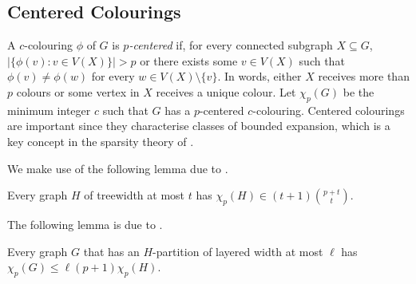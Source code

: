 \documentclass{patmorin}
\renewcommand{\le}{\leqslant}
\begin{document}
\subsection{Centered Colourings}

A $c$-colouring $\phi$ of $G$ is \emph{$p$-centered} if, for every connected subgraph $X\subseteq G$, $|\{\phi(v):v\in V(X)\}| > p$ or there exists some $v\in V(X)$ such that $\phi(v)\neq \phi(w)$ for every $w\in V(X)\setminus\{v\}$.  In words, either $X$ receives more than $p$ colours or some vertex in $X$ receives a unique colour.  Let $\chi_p(G)$ be the minimum integer $c$ such that $G$ has a $p$-centered $c$-colouring. 
Centered colourings are important since they characterise classes of bounded expansion, which is a key concept in the sparsity theory of \citet{Sparsity}. 

We make use of the following lemma due to \citet{pilipczuk.siebertz:polynomial-soda}.

\begin{lem}
\label{p-centered-treewidth}
Every graph $H$ of treewidth at most $t$ has $\chi_p(H)\in (t+1)\binom{p+t}{t}$.
\end{lem}

The following lemma is due to \citet{micek:personal}. 

\begin{lem}
\label{p-centered}
Every graph $G$ that has an $H$-partition of layered width at most $\ell$ has $\chi_p(G)\le \ell (p+1)\chi_p(H)$. 
\end{lem}
\end{document}
